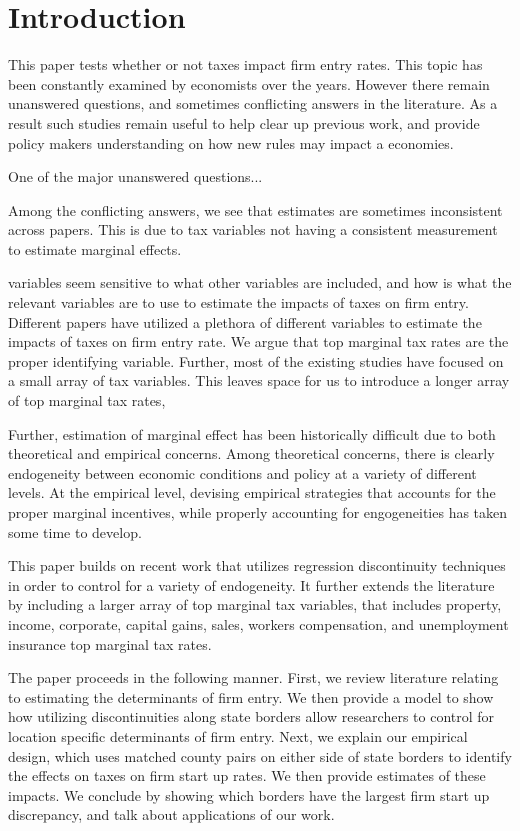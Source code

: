 
\section{Introduction} 

This paper tests whether or not taxes impact firm entry rates. This topic has been constantly examined by economists over the years. However there remain unanswered questions, and sometimes conflicting answers in the literature. As a result such studies remain useful to help clear up previous work, and provide policy makers understanding on how new rules may impact a economies.

One of the major unanswered questions...

 Among the conflicting answers, we see that estimates are sometimes inconsistent across papers. This is due to tax variables not having a consistent measurement to estimate marginal effects.


 variables seem sensitive to what other variables are included, and how  is what the relevant variables are to use to estimate the impacts of taxes on firm entry. Different papers have utilized a plethora of different variables to estimate the impacts of taxes on firm entry rate. We argue that top marginal tax rates are the proper identifying variable. Further, most of the existing studies have focused on a small array of tax variables. This leaves space for us to introduce a longer array of top marginal tax rates, 

Further, estimation of  marginal effect has been historically difficult due to both theoretical and empirical concerns. Among theoretical concerns, there is clearly endogeneity between economic conditions and policy at a variety of different levels. At the empirical level, devising empirical strategies that accounts for the proper marginal incentives, while properly accounting for engogeneities has taken some time to develop. 

This paper builds on recent work that utilizes regression discontinuity techniques in order to control for a variety of endogeneity. It further extends the literature by including a larger array of top marginal tax variables, that includes property, income, corporate, capital gains, sales, workers compensation, and unemployment insurance top marginal tax rates.

The paper proceeds in the following manner. First, we review literature relating to estimating the determinants of firm entry. We then provide a model to show how utilizing discontinuities along state borders allow researchers to control for location specific determinants of firm entry. Next, we explain our empirical design, which uses matched county pairs on either side of state borders to identify the effects on taxes on firm start up rates. We then provide estimates of these impacts. We conclude by showing which borders have the largest firm start up discrepancy, and talk about applications of our work.